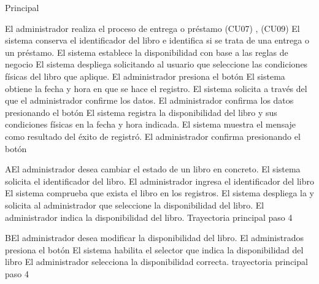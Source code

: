 	\begin{UCtrayectoria}{Principal}

			\UCpaso[\UCactor] El administrador  realiza el proceso de entrega o préstamo \UCref(CU07) , \UCref(CU09) 
			\UCpaso[\UCsist] El sistema conserva el identificador del libro e identifica si se trata de una entrega o un préstamo.
			\UCpaso[\UCsist] El sistema establece la disponibilidad con base a las reglas de negocio   
			\UCpaso[\UCsist] El sistema despliega  solicitando al usuario que seleccione las  condiciones físicas del libro que aplique.
			\UCpaso[\UCactor] El administrador presiona el botón 
			\UCpaso[\UCsist] El sistema obtiene la fecha y hora en  que se hace el registro.
			\UCpaso[\UCsist] El sistema solicita a través del   que el administrador confirme los datos.
			\UCpaso[\UCactor] El administrador confirma los datos presionando el botón  
			\UCpaso[\UCsist] El sistema registra la  disponibilidad del libro y sus condiciones físicas en la fecha y hora indicada.
			\UCpaso[\UCsist] El sistema muestra el mensaje  como resultado del éxito de registró.
			\UCpaso[\UCactor] El administrador confirma presionando el botón  

	\end{UCtrayectoria}
		\begin{UCtrayectoriaA}{A}{El administrador desea cambiar el estado de un libro en concreto.}
			\UCpaso[\UCsist]  El sistema solicita el identificador del libro.
			\UCpaso[\UCactor] El administrador ingresa el identificador del libro 
			\UCpaso[\UCsist] El sistema comprueba que exista el libro en los registros.
			\UCpaso[\UCsist] El sistema despliega la  y solicita al administrador que seleccione la disponibilidad del libro.
			\UCpaso[\UCactor] El administrador indica la disponibilidad del libro.
			     Trayectoria principal paso 4 
		\end{UCtrayectoriaA}

		\begin{UCtrayectoriaA}{B}{El administrador desea modificar la disponibilidad del libro.}
			\UCpaso[\UCactor] El administrados presiona el botón 
			\UCpaso[\UCsist] El sistema habilita el selector que indica la disponibilidad del libro
			\UCpaso[\UCactor] El administrador selecciona la disponibilidad correcta.
			 trayectoria principal paso 4 
		\end{UCtrayectoriaA}


